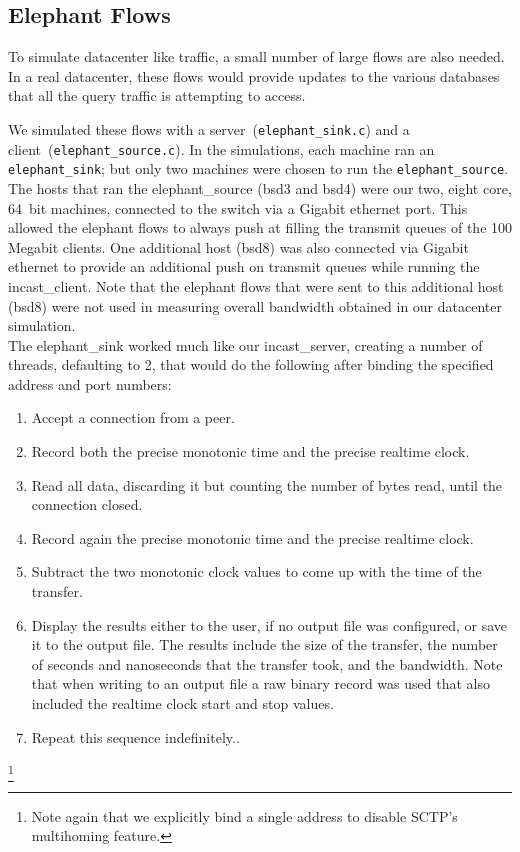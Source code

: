 \documentclass[12pt]{article}
\begin{document}
\subsection{Elephant Flows}
\label{elephants}
To simulate datacenter like traffic, a small number of large flows are also needed. In a
real datacenter, these flows would provide updates to the various databases that all the query traffic is attempting to access. 

We simulated these flows
with a server~(\texttt{elephant\_sink.c}) and a client~(\texttt{elephant\_source.c}). In the simulations, each machine ran
an \texttt{elephant\_sink}; but only two machines were chosen to run the \texttt{elephant\_source}. The hosts
that ran the elephant\_source (bsd3 and bsd4) were our two, eight core, 64~bit machines, connected to the switch
via a Gigabit ethernet port. This allowed the elephant flows to always push at filling the transmit queues
of the 100 Megabit clients. One additional host (bsd8) was also connected via Gigabit ethernet to provide
an additional push on transmit queues while running the incast\_client. Note that the elephant flows that
were sent to this additional host (bsd8) were not used in measuring overall bandwidth obtained 
in our datacenter simulation.
\\

The elephant\_sink worked much like our incast\_server, creating a
number of threads, defaulting to 2, that
would do the following after binding the specified address and port numbers:
\begin{enumerate}

\item Accept a connection from a peer.

\item Record both the precise monotonic time and the precise realtime clock.

\item Read all data, discarding it but counting the number of bytes read, until the connection closed.

\item Record again the precise monotonic time and the precise realtime clock.

\item Subtract the two monotonic clock values to come up with the time of the transfer.


\item Display the results either to the user, if no output file was configured, or save
it to the output file. The results include the size of the transfer, the number of seconds and nanoseconds
that the transfer took, and the bandwidth. Note that when writing to an output file a raw binary record
was used that also included the realtime clock start and stop values.

\item Repeat this sequence indefinitely..

\end{enumerate}
\footnote{Note again that we explicitly bind a
single address to disable SCTP's multihoming feature.}
\end{document}
